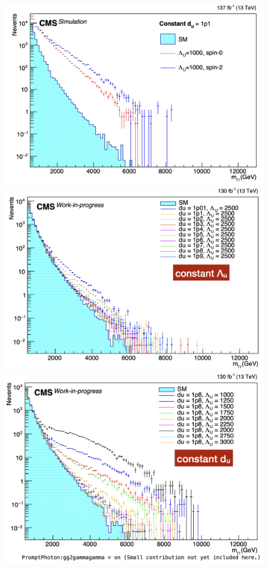 \begin{figure}[!htbp]
	\centering
    \includegraphics[scale=0.34]{fig/UnparticlesSpinSensitivity.png}
    \includegraphics[scale=0.4]{fig/UnparticlesConstantLambda_U.png}
    \includegraphics[scale=0.4]{fig/UnparticlesConstant_du.png}
   

\end{figure}

